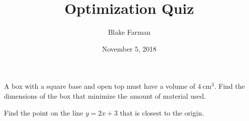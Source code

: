 \documentclass[10pt]{amsart}
\title{Optimization Quiz}
\date{November 5, 2018}
\author{Blake Farman}
\begin{document}
\maketitle

\makenameslot

\begin{thm}
  A box with a square base and open top must have a volume of \(4\ \text{cm}^3\).
  Find the dimensions of the box that minimize the amount of material used.\\
\end{thm}

\vspace{2.5in}

\begin{thm}
  Find the point on the line \(y = 2x + 3\) that is closest to the origin.
\end{thm}
\end{document}
